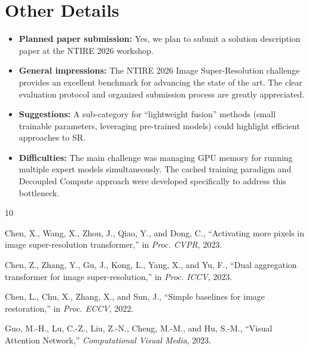 \documentclass[10pt,twocolumn,letterpaper]{article}
\begin{document}
\section{Other Details}

\begin{itemize}[nosep,leftmargin=*]
\item \textbf{Planned paper submission:} Yes, we plan to submit a solution description paper at the NTIRE 2026 workshop.
\item \textbf{General impressions:} The NTIRE 2026 Image Super-Resolution challenge provides an excellent benchmark for advancing the state of the art. The clear evaluation protocol and organized submission process are greatly appreciated.
\item \textbf{Suggestions:} A sub-category for ``lightweight fusion'' methods (small trainable parameters, leveraging pre-trained models) could highlight efficient approaches to SR.
\item \textbf{Difficulties:} The main challenge was managing GPU memory for running multiple expert models simultaneously. The cached training paradigm and Decoupled Compute approach were developed specifically to address this bottleneck.
\end{itemize}

{\small


\begin{thebibliography}{10}

Chen, X., Wang, X., Zhou, J., Qiao, Y., and Dong, C.,
``Activating more pixels in image super-resolution transformer,''
in \emph{Proc. CVPR}, 2023.

Chen, Z., Zhang, Y., Gu, J., Kong, L., Yang, X., and Yu, F.,
``Dual aggregation transformer for image super-resolution,''
in \emph{Proc. ICCV}, 2023.

Chen, L., Chu, X., Zhang, X., and Sun, J.,
``Simple baselines for image restoration,''
in \emph{Proc. ECCV}, 2022.

Guo, M.-H., Lu, C.-Z., Liu, Z.-N., Cheng, M.-M., and Hu, S.-M.,
``Visual Attention Network,''
\emph{Computational Visual Media}, 2023.

\end{thebibliography}
}
\end{document}
